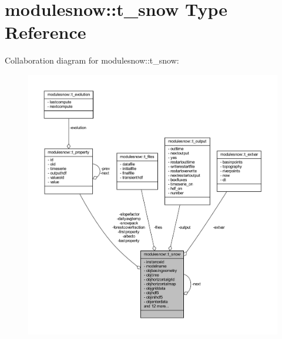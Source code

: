 \hypertarget{structmodulesnow_1_1t__snow}{}\section{modulesnow\+:\+:t\+\_\+snow Type Reference}
\label{structmodulesnow_1_1t__snow}


Collaboration diagram for modulesnow\+:\+:t\+\_\+snow\+:\nopagebreak
\begin{figure}[H]
\begin{center}
\leavevmode
\includegraphics[width=350pt]{structmodulesnow_1_1t__snow__coll__graph}
\end{center}
\end{figure}
